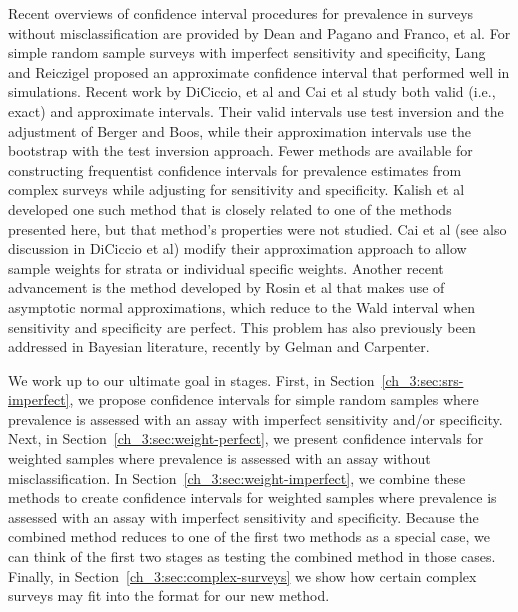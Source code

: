 Recent overviews of confidence interval procedures for prevalence in surveys without misclassification are provided by Dean and Pagano\cite{Dean:2015} and Franco, et al.\cite{franco2019}
For simple random sample surveys with imperfect sensitivity and specificity, Lang and Reiczigel\cite{Lang:2014} proposed an approximate confidence interval that performed well in simulations. Recent work by DiCiccio, et al \cite{DiCi:2021} and Cai et al\cite{Cai:2020} study both valid (i.e., exact) and approximate intervals. Their valid intervals use test inversion and the adjustment of Berger and Boos,\cite{Berg:1994} while their approximation intervals use the bootstrap with the test inversion approach.
Fewer methods are available for constructing frequentist confidence intervals for prevalence estimates from complex surveys while adjusting for sensitivity and specificity.
Kalish et al\cite{Kali:2021} developed one such method that is closely related to one of the methods presented here, but that method's properties were not studied.
Cai et al\cite{Cai:2020} (see also discussion in DiCiccio et al\cite{DiCi:2021}) modify their approximation approach to allow sample weights for strata or individual specific weights.
Another recent advancement is the method developed by Rosin et al\cite{rosin2021estimating} that makes use of asymptotic normal approximations, which reduce to the Wald interval when sensitivity and specificity are perfect.
This problem has also previously been addressed in Bayesian literature, recently by Gelman and Carpenter. \cite{GelmanBayes}

We work up to our ultimate goal in stages.
First, in Section~\ref{ch_3:sec:srs-imperfect}, we propose confidence intervals for simple random samples where prevalence is assessed with an assay with imperfect sensitivity and/or specificity.
Next, in Section~\ref{ch_3:sec:weight-perfect}, we present confidence intervals for weighted samples where prevalence is assessed with an assay without misclassification.
In Section~\ref{ch_3:sec:weight-imperfect}, we combine these methods to create confidence intervals for weighted samples where prevalence is assessed with an assay with imperfect sensitivity and specificity.
Because the combined method reduces to one of the first two methods as a special case, we can think of the first two stages as testing the combined method in those cases.
Finally, in Section~\ref{ch_3:sec:complex-surveys} we show how certain complex surveys may fit into the format for our new method.


